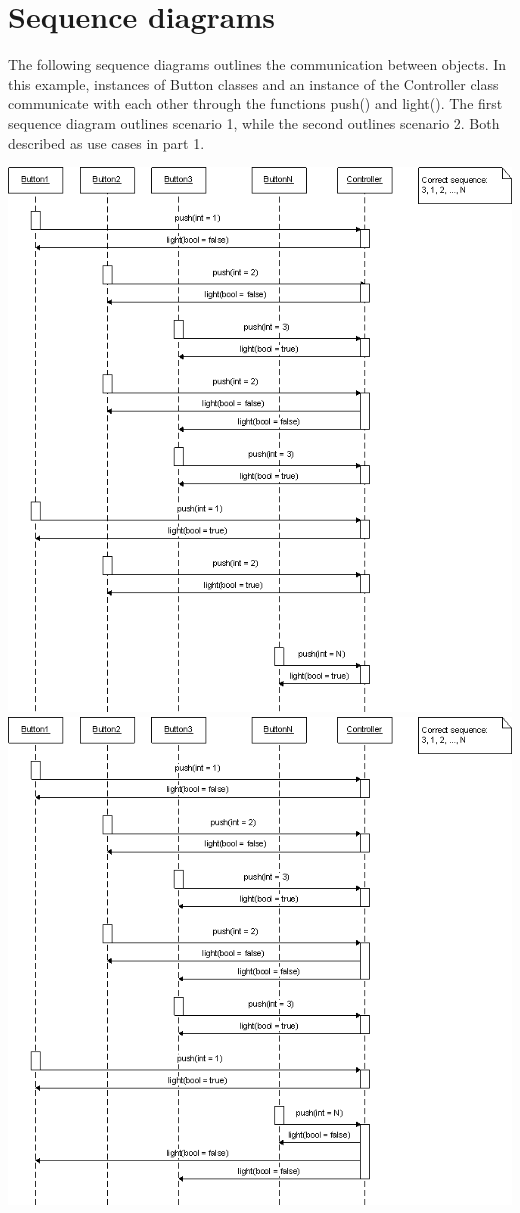 \documentclass{article}
\begin{document}
\section{Sequence diagrams}
The following sequence diagrams outlines the communication between objects.
In this example, instances of Button classes and an instance of the Controller
class communicate with each other through the functions push() and light(). The
first sequence diagram outlines scenario 1, while the second outlines scenario
2. Both described as use cases in part 1.

\begin{center}
  \includegraphics[width=\linewidth]{../sequence_scenario1}
  \includegraphics[width=\linewidth]{../sequence_scenario2}

\end{center}
\end{document}
